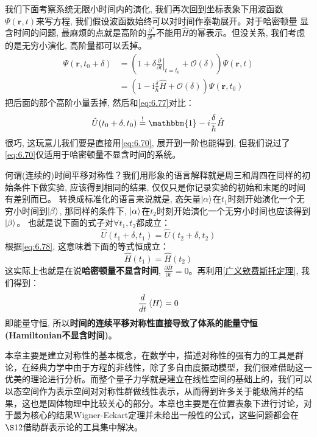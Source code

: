 \documentclass[a4paper,zihao=-4,linespread=1]{ctexrep}
\begin{document}
    我们下面考察系统无限小时间内的演化, 我们再次回到坐标表象下用波函数$\Psi(\mathbf{r},t)$来写方程, 我们假设波函数始终可以对时间作泰勒展开。对于哈密顿量
    显含时间的问题, 最麻烦的点就是高阶的$\frac{\partial^n}{\partial t^n}$不能用$\hat{H}$的幂表示。但没关系, 我们考虑的是无穷小演化, 高阶量都可以丢掉。
    \begin{align*}
        \Psi(\mathbf{r},t_0+\delta)&=\left(1+\delta\left.\frac{\partial }{\partial t}\right|_{t=t_0}+\mathcal{O}(\delta)\right)\Psi(\mathbf{r},t)\\
        &=\left(1-\mathrm{i}\frac{\delta}{\hbar}\hat{H}+\mathcal{O}(\delta)\right)\Psi(\mathbf{r},t_0)
    \end{align*}
    把后面的那个高阶小量丢掉, 然后和\ref{eq:6.77}对比：
    \begin{equation}
        \label{eq:6.78}
        \hat{U}(t_0+\delta,t_0)\overset{!}{=}\mathbbm{1}-i\frac{\delta}{\hbar}\hat{H}
    \end{equation}
    很巧, 这玩意儿我们要是直接用\ref{eq:6.70}, 展开到一阶也能得到, 但我们说过了\ref{eq:6.70}仅适用于哈密顿量不显含时间的系统。

    何谓(连续的)时间平移对称性？我们用形象的语言解释就是周三和周四在同样的初始条件下做实验, 应该得到相同的结果, 仅仅只是你记录实验的初始和末尾的时间有差别而已。
    转换成标准化的语言来说就是, 态矢量$\ket{\alpha}$在$t_1$时刻开始演化一个无穷小时间到$\ket{\beta}$, 那同样的条件下, $\ket{\alpha}$在$t_2$时刻开始演化一个无穷小时间也应该得到$\ket{\beta}$。
    也就是说下面的式子对$\forall t_1,t_2$都成立：
    \[\hat U(t_1+\delta,t_1)=\hat{U}(t_2+\delta,t_2)\]
    根据\ref{eq:6.78}, 这意味着下面的等式恒成立：
    \[\hat{H}(t_1)=\hat{H}(t_2)\]
    这实际上也就是在说\textbf{哈密顿量不显含时间}, $\frac{\partial \hat{H}}{\partial t}=0$。再利用\ref{广义欸费斯托定理}, 我们得到：
    \[\frac{d}{dt}\braket{H}=0\]
    即能量守恒, 所以\textbf{时间的连续平移对称性直接导致了体系的能量守恒(Hamiltonian不显含时间)}。


	本章主要是建立对称性的基本概念，在数学中，描述对称性的强有力的工具是群论，在经典力学中由于方程的非线性，除了多自由度振动模型，我们很难借助这一优美的理论进行分析。而整个量子力学就是建立在线性空间的基础上的，我们可以以态空间作为表示空间对对称性群做线性表示，从而得到许多关于能级简并的结果，这也是固体物理中比较关心的部分。本章也主要是在位置表象下进行讨论，对于最为核心的结果Wigner-Eckart定理并未给出一般性的公式，这些问题都会在$\S 12$借助群表示论的工具集中解决。
	
\end{document}
